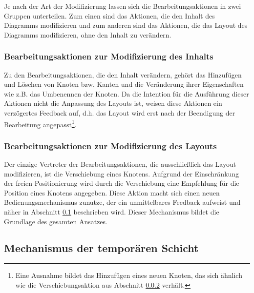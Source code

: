 Je nach der Art der Modifizierung lassen sich die Bearbeitungsaktionen in zwei Gruppen unterteilen. Zum einen sind das Aktionen, die den Inhalt des Diagramms modifizieren und zum anderen sind das Aktionen, die das Layout des Diagramms modifizieren, ohne den Inhalt zu verändern.

\subsubsection{Bearbeitungsaktionen zur Modifizierung des Inhalts}

Zu den Bearbeitungsaktionen, die den Inhalt verändern, gehört das Hinzufügen und Löschen von Knoten bzw. Kanten und die Veränderung ihrer Eigenschaften wie z.B. das Umbenennen der Knoten. Da die Intention für die Ausführung dieser Aktionen nicht die Anpassung des Layouts ist, weisen diese Aktionen ein verzögertes Feedback auf, d.h. das Layout wird erst nach der Beendigung der Bearbeitung angepasst\footnote{Eine Ausnahme bildet das Hinzufügen eines neuen Knoten, das sich ähnlich wie die Verschiebungsaktion aus Abschnitt \ref{subsubsec:edit-action-for-modifying-layout} verhält.}.

\subsubsection{Bearbeitungsaktionen zur Modifizierung des Layouts}
\label{subsubsec:edit-action-for-modifying-layout}

Der einzige Vertreter der Bearbeitungsaktionen, die ausschließlich das Layout modifizieren, ist die Verschiebung eines Knotens. Aufgrund der Einschränkung der freien Positionierung wird durch die Verschiebung eine Empfehlung für die Position eines Knotens angegeben. Diese Aktion macht sich einen neuen Bedienungsmechanismus zunutze, der ein unmittelbares Feedback aufweist und näher in Abschnitt \ref{subsec:temporary-layer-mechanism} beschrieben wird. Dieser Mechanismus bildet die Grundlage des gesamten Ansatzes.

\subsection{Mechanismus der temporären Schicht}
\label{subsec:temporary-layer-mechanism}

